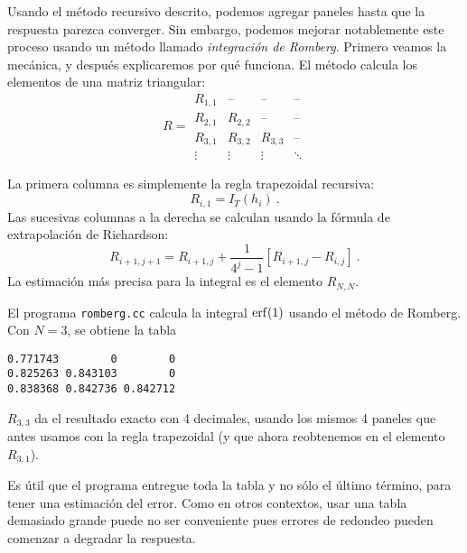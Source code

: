 \documentclass[12pt]{article}
\begin{document}
Usando el m\'etodo recursivo descrito, podemos agregar paneles hasta
que la respuesta parezca converger. Sin embargo, podemos mejorar
notablemente este proceso usando un m\'etodo llamado {\em
  integraci\'on de Romberg}. Primero veamos la mec\'anica, y despu\'es
explicaremos por qu\'e funciona. El m\'etodo calcula los elementos
de una  matriz triangular:
\begin{equation}
  R = 
\begin{matrix}
R_{1,1} & \text{--} & \text{--} & \text{--} \\
R_{2,1} & R_{2,2} & \text{--} & \text{--} \\
R_{3,1} & R_{3,2} & R_{3,3} & \text{--} \\
\vdots & \vdots & \vdots & \ddots
\end{matrix}
\end{equation}

La primera columna es simplemente la regla trapezoidal recursiva:
\begin{equation}
  R_{i,1} = I_T(h_i) \ . 
\end{equation}
Las sucesivas columnas a la  derecha se calculan usando la f\'ormula
de extrapolaci\'on de Richardson:
\begin{equation}
  R_{i+1,j+1} = R_{i+1,j} + \frac 1{4^j-1} [ R_{i+1,j} - R_{i,j} ] \
.
\end{equation}
La estimaci\'on m\'as precisa para la integral es el elemento
$R_{N,N}$. 


El programa \verb+romberg.cc+ calcula la integral $\operatorname{erf}(1)$ usando el
m\'etodo de Romberg. Con $N=3$, se obtiene la tabla
\begin{verbatim}
0.771743        0        0 
0.825263 0.843103        0 
0.838368 0.842736 0.842712 
\end{verbatim}
$R_{3,3}$ da el resultado exacto con 4 decimales, usando los mismos 4
paneles que antes usamos con la regla trapezoidal (y que ahora
reobtenemos en el elemento $R_{3,1}$). 

Es \'util que el programa entregue toda la tabla y no s\'olo el
\'ultimo t\'ermino, para tener una estimaci\'on del error. Como en
otros contextos, usar una tabla demasiado grande puede no ser
conveniente pues errores de redondeo pueden comenzar a degradar la
respuesta. 
\end{document}
